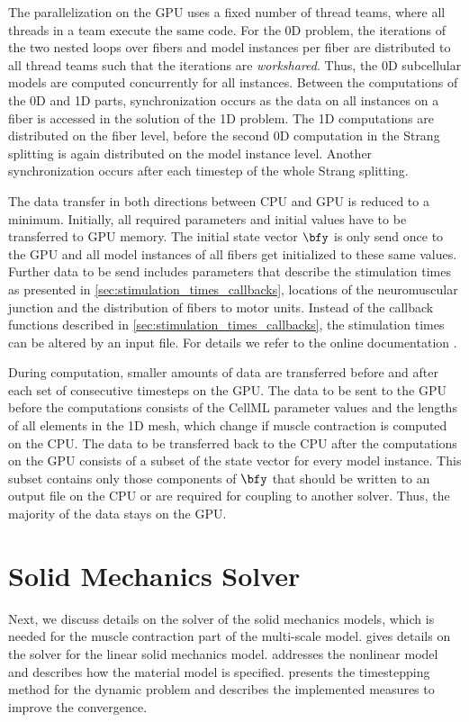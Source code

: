 The parallelization on the GPU uses a fixed number of thread teams, where all threads in a team execute the same code.
For the 0D problem, the iterations of the two nested loops over fibers and model instances per fiber are distributed to all thread teams such that the iterations are \emph{workshared}. Thus, the 0D subcellular models are computed concurrently for all instances. Between the computations of the 0D and 1D parts, synchronization occurs as the data on all instances on a fiber is accessed in the solution of the 1D problem. The 1D computations are distributed on the fiber level, before the second 0D computation in the Strang splitting is again distributed on the model instance level.
Another synchronization occurs after each timestep of the whole Strang splitting.

The data transfer in both directions between CPU and GPU is reduced to a minimum. Initially, all required parameters and initial values have to be transferred to GPU memory. The initial state vector $\bfy$ is only send once to the GPU and all model instances of all fibers get initialized to these same values. Further data to be send includes parameters that describe the stimulation times as presented in \cref{sec:stimulation_times_callbacks}, locations of the neuromuscular junction and the distribution of fibers to motor units. Instead of the callback functions described in \cref{sec:stimulation_times_callbacks}, the stimulation times can be altered by an input file. For details we refer to the online documentation \cite{opendihuWeb}.

During computation, smaller amounts of data are transferred before and after each set of consecutive timesteps on the GPU. The data to be sent to the GPU before the computations consists of the CellML parameter values and the lengths of all elements in the 1D mesh, which change if muscle contraction is computed on the CPU. The data to be transferred back to the CPU after the computations on the GPU consists of a subset of the state vector for every model instance. This subset contains only those components of $\bfy$ that should be written to an output file on the CPU or are required for coupling to another solver. Thus, the majority of the data stays on the GPU.


\section{Solid Mechanics Solver}\label{sec:solid_mechanics_solver}
Next, we discuss details on the solver of the solid mechanics models, which is needed for the muscle contraction part of the multi-scale model.
 gives details on the solver for the linear solid mechanics model.  addresses the nonlinear model and describes how the material model is specified.  presents the timestepping method for the dynamic problem and describes the implemented measures to improve the convergence.

